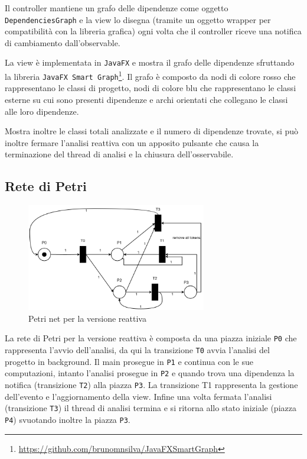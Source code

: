 \documentclass[11pt,notitlepage]{article}
\begin{document}
Il controller mantiene un grafo delle dipendenze come oggetto \texttt{DependenciesGraph} e la view lo disegna (tramite un oggetto wrapper per compatibilità con la libreria grafica)
ogni volta che il controller riceve una notifica di cambiamento dall'observable.

La view è implementata in \texttt{JavaFX} e mostra il grafo delle dipendenze sfruttando la libreria \texttt{JavaFX Smart Graph}\footnote{\url{https://github.com/brunomnsilva/JavaFXSmartGraph}}.
Il grafo è composto da nodi di colore rosso che rappresentano le classi di progetto, nodi di colore blu che rappresentano le classi esterne su cui sono presenti dipendenze e archi orientati
che collegano le classi alle loro dipendenze.

Mostra inoltre le classi totali analizzate e il numero di dipendenze trovate, si può inoltre fermare l'analisi reattiva con un apposito pulsante che causa la
terminazione del thread di analisi e la chiusura dell'osservabile.

\subsection{Rete di Petri}

\begin{figure}[H]
    \centering
    \includegraphics[width=0.7\textwidth]{Petri_reactive.png}
    \caption{Petri net per la versione reattiva}
    \label{fig:rete-petri-reattiva}
\end{figure}

La rete di Petri per la versione reattiva è composta da una piazza iniziale \texttt{P0} che rappresenta l'avvio dell'analisi, da qui la transizione \texttt{T0} avvia l'analisi del progetto
in background. Il main prosegue in \texttt{P1} e continua con le sue computazioni, intanto l'analisi prosegue in \texttt{P2} e quando trova una dipendenza la notifica (transizione \texttt{T2})
alla piazza \texttt{P3}. La transizione T1 rappresenta la gestione dell'evento e l'aggiornamento della view. Infine una volta fermata l'analisi (transizione \texttt{T3}) il thread di analisi 
termina e si ritorna allo stato iniziale (piazza \texttt{P4}) svuotando inoltre la piazza \texttt{P3}.
\end{document}
